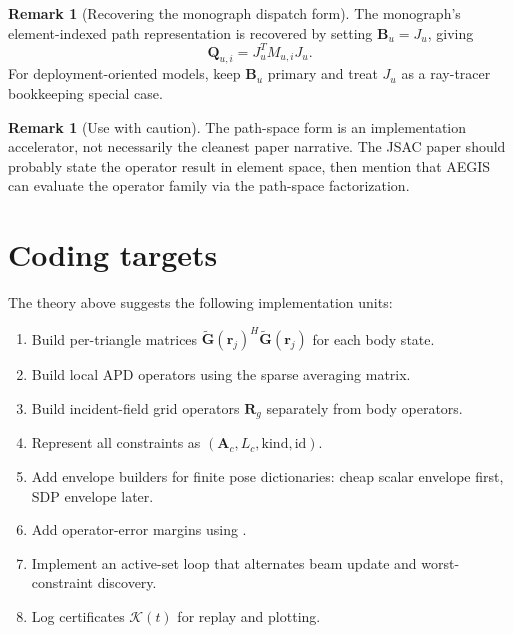 \documentclass[11pt,a4paper]{article}
\theoremstyle{definition}
\newtheorem{remark}[definition]{Remark}
\theoremstyle{plain}
\newcommand{\rr}{\mathbf r}
\newcommand{\B}{\mathbf B}
\newcommand{\Q}{\mathbf Q}
\newcommand{\A}{\mathbf A}
\newcommand{\R}{\mathbf R}
\newcommand{\Gtil}{\widetilde{\mathbf G}}
\begin{document}
\begin{remark}[Recovering the monograph dispatch form]
The monograph's element-indexed path representation is recovered by setting
$\B_u=J_u$, giving
\[
  \Q_{u,i}=J_u^T M_{u,i}J_u.
\]
For deployment-oriented models, keep $\B_u$ primary and treat $J_u$ as a
ray-tracer bookkeeping special case.
\end{remark}

\begin{remark}[Use with caution]
The path-space form is an implementation accelerator, not necessarily the
cleanest paper narrative.  The JSAC paper should probably state the
operator result in element space, then mention that AEGIS can evaluate the
operator family via the path-space factorization.
\end{remark}

\section{Coding targets}

The theory above suggests the following implementation units:
\begin{enumerate}[leftmargin=1.7em,itemsep=0.25em]
  \item Build per-triangle matrices
  $\Gtil(\rr_j)^H\Gtil(\rr_j)$ for each body state.
  \item Build local APD operators using the sparse averaging matrix.
  \item Build incident-field grid operators $\R_g$ separately from body
  operators.
  \item Represent all constraints as $(\A_c,L_c,\mathrm{kind},\mathrm{id})$.
  \item Add envelope builders for finite pose dictionaries:
  cheap scalar envelope first, SDP envelope later.
  \item Add operator-error margins using .
  \item Implement an active-set loop that alternates beam update and
  worst-constraint discovery.
  \item Log certificates $\mathcal K(t)$ for replay and plotting.
\end{enumerate}
\end{document}
